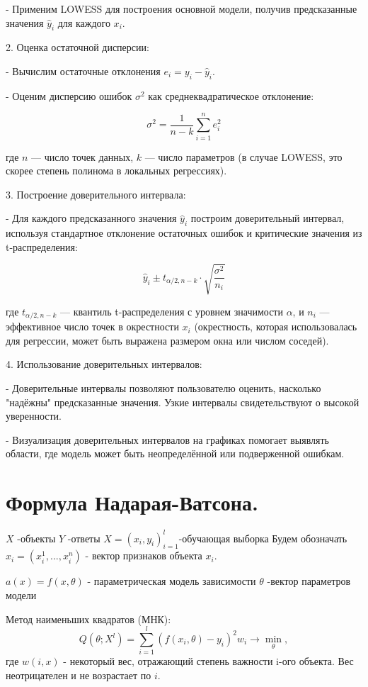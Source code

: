    - Применим LOWESS для построения основной модели, получив предсказанные значения \( \hat{y}_i \) для каждого \(x_i\).

2. Оценка остаточной дисперсии:

   - Вычислим остаточные отклонения \(e_i = y_i - \hat{y}_i\).

   - Оценим дисперсию ошибок \(\sigma^2\) как среднеквадратическое отклонение:

     \[
     \sigma^2 = \frac{1}{n-k} \sum_{i=1}^{n} e_i^2
     \]

   где \(n\) — число точек данных, \(k\) — число параметров (в случае LOWESS, это скорее степень полинома в локальных регрессиях).

3. Построение доверительного интервала:

   - Для каждого предсказанного значения \( \hat{y}_i \) построим доверительный интервал, используя стандартное отклонение остаточных ошибок и критические значения из t-распределения:

     \[
     \hat{y}_i \pm t_{\alpha/2, n-k} \cdot \sqrt{\frac{\sigma^2}{n_i}}
     \]

   где \( t_{\alpha/2, n-k} \) — квантиль t-распределения с уровнем значимости \(\alpha\), и \(n_i\) — эффективное число точек в окрестности \(x_i\) (окрестность, которая использовалась для регрессии, может быть выражена размером окна или числом соседей).

4. Использование доверительных интервалов:

   - Доверительные интервалы позволяют пользователю оценить, насколько "надёжны" предсказанные значения. Узкие интервалы свидетельствуют о высокой уверенности.

   - Визуализация доверительных интервалов на графиках помогает выявлять области, где модель может быть неопределённой или подверженной ошибкам.

\section{Формула Надарая-Ватсона.}
 $X$ -объекты
 $Y$ -ответы
 $X = (x_i, y_i)^l_{i=1}$-обучающая выборка
Будем обозначать $x_i = (x_i^1, ..., x_i^n)$ - вектор признаков объекта $x_i$.

$a(x)= f(x,\theta)$ - параметрическая модель зависимости
$\theta$ -вектор параметров модели

Метод наименьших квадратов (МНК):
\begin{equation*}
    \displaystyle Q(\theta; X^l) =  \sum\limits_{i=1}^l(f(x_i, \theta)-y_i)^2w_i \longrightarrow \min_\theta,
\end{equation*}
где $w(i,x)$ - некоторый вес, отражающий степень важности i-ого объекта. Вес неотрицателен и не возрастает по $i$.


